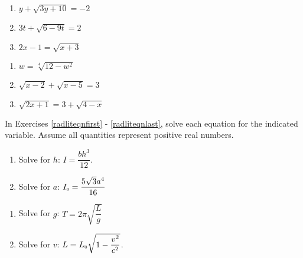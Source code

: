 \documentclass{ximera}
\begin{document}
\begin{multicols}{3}
\begin{enumerate}
\setcounter{enumi}{\value{HW}}

\item  $y + \sqrt{3y+10} = -2$ %
\item  $3t+\sqrt{6-9t}=2$ %
\item $2x - 1 = \sqrt{x + 3}$ %

\setcounter{HW}{\value{enumi}}
\end{enumerate}
\end{multicols}

\begin{multicols}{3}
\begin{enumerate}
\setcounter{enumi}{\value{HW}}


\item $w = \sqrt[4]{12-w^2}$
\item $\sqrt{x - 2} + \sqrt{x - 5} = 3$ %
\item $\sqrt{2x+1} = 3 + \sqrt{4-x}$  \label{algineqexlast} %


\setcounter{HW}{\value{enumi}}
\end{enumerate}
\end{multicols}

In Exercises \ref{radliteqnfirst} - \ref{radliteqnlast}, solve each equation for the indicated variable.  Assume all quantities represent positive real numbers.

\begin{multicols}{2}
\begin{enumerate}
\setcounter{enumi}{\value{HW}}


\item Solve for $h$:  $I = \dfrac{bh^3}{12}$.  \label{radliteqnfirst}

\item Solve for $a$:  $I_{\text{\tiny $0$}} = \dfrac{5\sqrt{3} a^4}{16}$

\setcounter{HW}{\value{enumi}}
\end{enumerate}
\end{multicols}


\begin{multicols}{2}
\begin{enumerate}
\setcounter{enumi}{\value{HW}}


\item Solve for $g$:  $T = 2\pi \sqrt{\dfrac{L}{g}}$

\item Solve for $v$:   $L = L_{\text{\tiny $0$}} \sqrt{1 - \dfrac{v^2}{c^2}}$.  \label{radliteqnlast}

\setcounter{HW}{\value{enumi}}
\end{enumerate}
\end{multicols}
\end{document}
